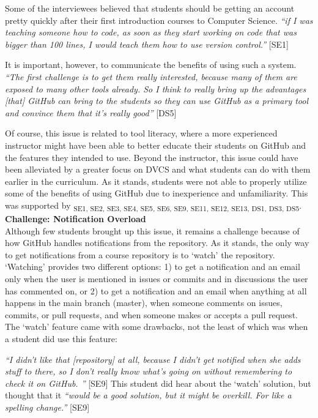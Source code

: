 Some of the interviewees believed that students should be getting an account pretty quickly after their first introduction courses to Computer Science. \textit{``if I was teaching someone how to code, as soon as they start working on code that was bigger than 100 lines, I would teach them how to use version control.''} [SE1]


It is important, however, to communicate the benefits of using such a system. \textit{``The first challenge is to get them really interested, because many of them are exposed to many other tools already. So I think to really bring up the advantages [that] GitHub can bring to the students so they can use GitHub as a primary tool and convince them that it's really good''} [DS5]

Of course, this issue is related to tool literacy, where a more experienced instructor might have been able to better educate their students on GitHub and the features they intended to use. Beyond the instructor, this issue could have been alleviated by a greater focus on DVCS and what students can do with them earlier in the curriculum. As it stands, students were not able to properly utilize some of the benefits of using GitHub due to inexperience and unfamiliarity. This was supported by \textsubscript{SE1, SE2, SE3, SE4, SE5, SE6, SE9, SE11, SE12, SE13, DS1, DS3, DS5}. \\

\textbf{Challenge: Notification Overload} \\
Although few students brought up this issue, it remains a challenge because of how GitHub handles notifications from the repository. As it stands, the only way to get notifications from a course repository is to `watch' the repository. `Watching' provides two different options: 1) to get a notification and an email only when the user is mentioned in issues or commits and in discussions the user has commented on, or 2) to get a notification and an email when anything at all happens in the main branch (master), when someone comments on issues, commits, or pull requests, and when someone makes or accepts a pull request. The `watch' feature came with some drawbacks, not the least of which was when a student did use this feature:

\textit{``I didn't like that [repository] at all, because I didn't get notified when she adds stuff to there, so I don't really know what's going on without remembering to check it on GitHub. ''} [SE9] This student did hear about the `watch' solution, but thought that it \textit{``would be a good solution, but it might be overkill. For like a spelling change.''} [SE9]

